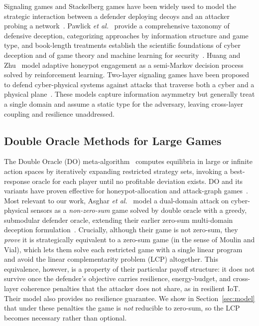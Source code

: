 \documentclass[conference]{IEEEtran}
\begin{document}
Signaling games and Stackelberg games have been widely used to model the
strategic interaction between a defender deploying decoys and an attacker
probing a network~\cite{tambe2011}. Pawlick \textit{et al.}~\cite{pawlick2019}
provide a comprehensive taxonomy of defensive deception, categorizing
approaches by information structure and game type, and book-length treatments
establish the scientific foundations of cyber deception and of game theory and
machine learning for security~\cite{jajodia2016,kamhoua2021}. Huang and
Zhu~\cite{huang2019} model adaptive honeypot engagement as a semi-Markov
decision process solved by reinforcement learning. Two-layer signaling games
have been proposed to defend cyber-physical systems against attacks that
traverse both a cyber and a physical plane~\cite{kamdem2024}. These models
capture information asymmetry but generally treat a single domain and assume a
static type for the adversary, leaving cross-layer coupling and resilience
unaddressed.

\subsection{Double Oracle Methods for Large Games}

The Double Oracle (DO) meta-algorithm~\cite{mcmahan2003} computes equilibria in
large or infinite action spaces by iteratively expanding restricted strategy
sets, invoking a best-response oracle for each player until no profitable
deviation exists. DO and its variants have proven effective for
honeypot-allocation and attack-graph
games~\cite{nguemkam2024,ngo2021,durkota2015}. Most relevant to our work, Asghar
\textit{et al.}~\cite{asghar2025} model a dual-domain attack on cyber-physical
sensors as a \emph{non-zero-sum} game solved by double oracle with a greedy,
submodular defender oracle, extending their earlier zero-sum multi-domain
deception formulation~\cite{asghar2024cns}. Crucially, although their game is
not zero-sum, they \emph{prove} it is strategically equivalent to a zero-sum
game (in the sense of Moulin and Vial), which lets them solve each restricted
game with a single linear program and avoid the linear complementarity problem
(LCP) altogether. This equivalence, however, is a property of their particular
payoff structure: it does not survive once the defender's objective carries
resilience, energy-budget, and cross-layer coherence penalties that the attacker
does not share, as in resilient IoT. Their model also provides no resilience
guarantee. We show in Section~\ref{sec:model} that under these penalties the
game is \emph{not} reducible to zero-sum, so the LCP becomes necessary rather
than optional.
\end{document}
